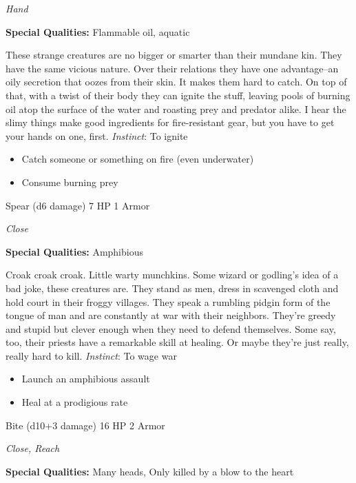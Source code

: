 \emph{Hand}

\textbf{Special Qualities:}
Flammable oil, aquatic

\HRule
These strange creatures are no bigger or smarter than their mundane kin. They have the same vicious nature. Over their relations they have one advantage--an oily secretion that oozes from their skin. It makes them hard to catch. On top of that, with a twist of their body they can ignite the stuff, leaving pools of burning oil atop the surface of the water and roasting prey and predator alike. I hear the slimy things make good ingredients for fire-resistant gear, but you have to get your hands on one, first. \emph{Instinct}: To ignite
\begin{itemize}
\item Catch someone or something on fire (even underwater)
\item Consume burning prey
\end{itemize}
\newpage
\HRule
{}

Spear (d6 damage)\hspace*{\fill} 7 HP 1 Armor

\emph{Close}

\textbf{Special Qualities:}
Amphibious

\HRule
Croak croak croak. Little warty munchkins. Some wizard or godling's idea of a bad joke, these creatures are. They stand as men, dress in scavenged cloth and hold court in their froggy villages. They speak a rumbling pidgin form of the tongue of man and are constantly at war with their neighbors. They're greedy and stupid but clever enough when they need to defend themselves. Some say, too, their priests have a remarkable skill at healing. Or maybe they're just really, really hard to kill. \emph{Instinct}: To wage war
\begin{itemize}
\item Launch an amphibious assault
\item Heal at a prodigious rate
\end{itemize}

\HRule
{}

Bite (d10+3 damage)\hspace*{\fill} 16 HP 2 Armor

\emph{Close, Reach}

\textbf{Special Qualities:}
Many heads, Only killed by a blow to the heart

